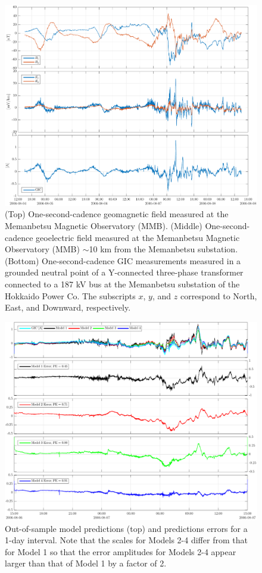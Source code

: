 \documentclass[draft,linenumbers]{agujournal2018}
\begin{document}
\begin{figure}[h]
\centering
\includegraphics[width=\textwidth]{figures/plot_raw_All_20060805.pdf}
\caption{(Top) One-second-cadence geomagnetic field measured at the Memanbetsu Magnetic Observatory (MMB). (Middle) One-second-cadence geoelectric field measured at the Memanbetsu Magnetic Observatory (MMB) $\sim$10 km from the Memanbetsu substation. (Bottom) One-second-cadence GIC measurements measured in a grounded neutral point of a Y-connected three-phase transformer connected to a 187 kV bus at the Memanbetsu substation of the Hokkaido Power Co. The subscripts $x$, $y$, and $z$ correspond to North, East, and Downward, respectively.}
\label{sample}
\end{figure}

\begin{figure}[h]
\centering
\includegraphics[width=\textwidth]{figures/plot_model_predictions-MeanModel-20060806T150000.pdf}
\caption{Out-of-sample model predictions (top) and predictions errors for a 1-day interval. Note that the scales for Models 2-4 differ from that for Model 1 so that the error amplitudes for Models 2-4 appear larger than that of Model 1 by a factor of 2.}
\label{predictions}
\end{figure}
\end{document}
